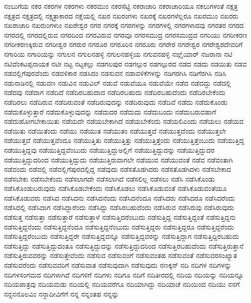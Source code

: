 {ನಂಬುಗೆಯ
ನಕರ
ನಕರಗಳ
ನಕರಗಳು
ನಕರಮುಂ
ನಕರಸೆಟ್ಟಿ
ನಕರಾಚಾರಿ
ನಕರಾಚಾರಿಯೂ
ನಕಲುಗಳಂತೆ
ನಕ್ಷತ್ರ
ನಕ್ಷತ್ರದ
ನಕ್ಷತ್ರದಲ್ಲಿ
ನಕ್ಷತ್ರಾಕಾರದ
ನಕ್ಷೆಯಲ್ಲಿ
ನಖರ
ನಖರಂಗಳು
ನಖರಕ್ಕೆ
ನಖರಗಳೆಲ್ಲರೂ
ನಖರಮುಂ
ನಖರರು
ನಖರಾಚಾರಿ
ನಖರುಂಗಳುಂ
ನಖರೇಶ್ವರ
ನಗರ
ನಗರಕ್ಕೆ
ನಗರಗಳನ್ನು
ನಗರಗಳಲ್ಲಿ
ನಗರಗಳಾದವು
ನಗರತರ
ನಗರದ
ನಗರದಲ್ಲಿ
ನಗರದಲ್ಲಿರುವ
ನಗರದಿಂದ
ನಗರವಿರುವ
ನಗರವೂ
ನಗರಸಮುದ್ರ
ನಗರಸಮುದ್ರದ
ನಗರಿಯು
ನಗರೀಕರಣ
ನಗರೀಕರಣಕ್ಕಿರುವ
ನಗರೀಶ್ವರ
ನಗರುರ
ನಗರೂರ
ನಗರೂರಿನ
ನಗರೂರು
ನಗರೇರ
ನಗರೇಶ್ವರ
ನಗರೇಶ್ವರದೇವರಿಗೆ
ನಗಾರಿಯ
ನಗಾರಿಯನ್ನು
ನಗುಲನ
ನಗುಲನಹಳ್ಳಿ
ನಗುಲನಹಳ್ಳಿಯ
ನಗುವನಹಳ್ಳಿ
ನಙ್ಗೈಯಾರ್
ನಜರಾನಾ
ನಟಿ
ನಟಿವೆಂಕಟಪ್ಪನಾಯಕ
ನಟೀ
ನಟ್ಟ
ನಟ್ಟಕಲ್ಲು
ನಡಗಲಪುರ
ನಡಗಲ್ಪುರ
ನಡಗಲ್ಪುರದ
ನಡದ
ನಡದು
ನಡಯಿತು
ನಡವ
ನಡವಲ್ಲಿಗೆಪುರವೆಂದು
ನಡವಳಿಕಾರ
ನಡಸಿದಂ
ನಡಸುವನ
ನಡಾವಳಿಕೆಗಳನ್ನು
ನಡಿಗರಗಿಸಿ
ನಡಿಗೆರಗಿಸಿ
ನಡಿಸಿ
ನಡುನಾಡಿನಲ್ಲಿ
ನಡುವಣ
ನಡುವಿನ
ನಡುವಿಲ್
ನಡುವೆ
ನಡುವೆಯೂ
ನಡುವೆಯೇ
ನಡೆದ
ನಡೆದದ್ದು
ನಡೆದಲ್ಲಿ
ನಡೆದವು
ನಡೆದಾಗ
ನಡೆದಿದೆ
ನಡೆದಿರಬಹುದಾದ
ನಡೆದಿರಬಹುದು
ನಡೆದಿರಬಹುದೆಂದು
ನಡೆದಿರಬೇಕೆಂದು
ನಡೆದಿರಲು
ನಡೆದಿರುವ
ನಡೆದಿರುವಂತೆ
ನಡೆದಿರುವುದನ್ನು
ನಡೆದಿರುವುದು
ನಡೆದಿವೆ
ನಡೆದು
ನಡೆದುಕೊಂಡು
ನಡೆದುಕೊಳ್ಳುತ್ತಾರೆ
ನಡೆದುಕೊಳ್ಳುವುದನ್ನು
ನಡೆದುದರ
ನಡೆದುದು
ನಡೆದುಬಂದು
ನಡೆದುಬರುವಹಾಗೆ
ನಡೆದುಹೋಗಬೇಕಾಯಿತು
ನಡೆಯದೇ
ನಡೆಯಬೇಕಾಗಿದೆ
ನಡೆಯಬೇಕೆಂದು
ನಡೆಯಲಿಎಂದು
ನಡೆಯಲು
ನಡೆಯವ
ನಡೆಯಿತು
ನಡೆಯಿತೆಂದು
ನಡೆಯು
ನಡೆಯುತ
ನಡೆಯುತಂ
ನಡೆಯುತ್ತದೆ
ನಡೆಯುತ್ತದೆಂದು
ನಡೆಯುತ್ತಲೇ
ನಡೆಯುತ್ತವೆ
ನಡೆಯುತ್ತವೆಂದೂ
ನಡೆಯುತ್ತಿತು
ನಡೆಯುತ್ತಿತ್ತು
ನಡೆಯುತ್ತಿತ್ತೆಂದು
ನಡೆಯುತ್ತಿತ್ತೆಂಬುದು
ನಡೆಯುತ್ತಿದ್ದ
ನಡೆಯುತ್ತಿದ್ದವು
ನಡೆಯುತ್ತಿದ್ದವೆಂಬುದು
ನಡೆಯುತ್ತಿದ್ದುಅಲ್ಲಿಗೆ
ನಡೆಯುತ್ತಿದ್ದುದನ್ನು
ನಡೆಯುತ್ತಿದ್ದುದರ
ನಡೆಯುತ್ತಿದ್ದುದರಿಂದ
ನಡೆಯುತ್ತಿದ್ದುದು
ನಡೆಯುತ್ತಿರುವಾಗಲೇ
ನಡೆಯುವ
ನಡೆಯುವಂತೆ
ನಡೆವ
ನಡೆವಂತಾಗಿ
ನಡೆವಂದು
ನಡೆವಲ್ಲಿ
ನಡೆವಲ್ಲಿಗೆಪುರದಲ್ಲಿದ್ದ
ನಡೆವುದು
ನಡೆಸತೊಡಗಿದರು
ನಡೆಸತೊಡಗಿದಳು
ನಡೆಸಬೇಕಾದ
ನಡೆಸಬೇಕು
ನಡೆಸಬೇಕೆಂದು
ನಡೆಸಲಾಗದೇ
ನಡೆಸಲಾಗಿದೆ
ನಡೆಸಲಿಲ್ಲ
ನಡೆಸಲು
ನಡೆಸಿ
ನಡೆಸಿಕೊಂಡು
ನಡೆಸಿಕೊಂಡುಬರುವುದು
ನಡೆಸಿಕೊಡಬೇಕೆಂದು
ನಡೆಸಿಕೊಡಲು
ನಡೆಸಿಕೊಡುವಂತೆ
ನಡೆಸಿಕೊಡುವಂತೆಯೂ
ನಡೆಸಿಕೊಡುವರು
ನಡೆಸಿದ
ನಡೆಸಿದನು
ನಡೆಸಿದನೆಂದು
ನಡೆಸಿದನೆಂದೂ
ನಡೆಸಿದರು
ನಡೆಸಿದರೂ
ನಡೆಸಿದರೆಂದು
ನಡೆಸಿದಲ್ಲಿ
ನಡೆಸಿದಾಗ
ನಡೆಸಿದ್ದಾರೆಂದು
ನಡೆಸಿದ್ದು
ನಡೆಸಿರಬಹುದೆಂದು
ನಡೆಸಿರುವ
ನಡೆಸಿರುವು
ನಡೆಸಿರುವುದು
ನಡೆಸುತ್ತ
ನಡೆಸುತ್ತಾ
ನಡೆಸುತ್ತಾರೆ
ನಡೆಸುತ್ತಾಳೆ
ನಡೆಸುತ್ತಿದರೆಂಬುದು
ನಡೆಸುತ್ತಿದ್ದ
ನಡೆಸುತ್ತಿದ್ದಂತೆ
ನಡೆಸುತ್ತಿದ್ದನು
ನಡೆಸುತ್ತಿದ್ದನೆಂದು
ನಡೆಸುತ್ತಿದ್ದನೆಂದೂ
ನಡೆಸುತ್ತಿದ್ದನೆಂಬುದು
ನಡೆಸುತ್ತಿದ್ದರು
ನಡೆಸುತ್ತಿದ್ದರೂ
ನಡೆಸುತ್ತಿದ್ದರೆಂದು
ನಡೆಸುತ್ತಿದ್ದರೆಂಬುದು
ನಡೆಸುತ್ತಿದ್ದರೇ
ನಡೆಸುತ್ತಿದ್ದವನ್ನೂ
ನಡೆಸುತ್ತಿದ್ದವರನ್ನು
ನಡೆಸುತ್ತಿದ್ದಾಗ
ನಡೆಸುತ್ತಿದ್ದಿರಬಹುದು
ನಡೆಸುತ್ತಿದ್ದು
ನಡೆಸುತ್ತಿದ್ದುದಂತೂ
ನಡೆಸುತ್ತಿದ್ದುದನ್ನು
ನಡೆಸುತ್ತಿದ್ದುದರಿಂದ
ನಡೆಸುತ್ತಿರಬಹುದೆಂದು
ನಡೆಸುತ್ತಿರುತ್ತಾನೆ
ನಡೆಸುತ್ತಿರುವವರನ್ನು
ನಡೆಸುತ್ತೇವೆಂದು
ನಡೆಸುವ
ನಡೆಸುವಂಗೆ
ನಡೆಸುವಂತಹ
ನಡೆಸುವಂತೆ
ನಡೆಸುವರಸಂಖ್ಯಾತ
ನಡೆಸುವರೆಂದು
ನಡೆಸುವವರಿಗೆ
ನಡೆಸುವಾತ
ನಡೆಸುವುದಾಗಿ
ನಡೆಸುವುದು
ನಣಕ್ಕನ್
ನದಿ
ನದಿಗಳ
ನದಿಗಳನ್ನು
ನದಿಗಳಸಂಗಮದ
ನದಿಗಳಾಗಿವೆ
ನದಿಗಳಿಗೆ
ನದಿಗಳು
ನದಿಗೂ
ನದಿಗೆ
ನದಿತೀರದಲ್ಲಿ
ನದಿಯ
ನದಿಯನ್ನು
ನದಿಯನ್ನೂ
ನದಿಯಪಾತ್ರವು
ನದಿಯಮಡು
ನದಿಯಲ್ಲಿ
ನದಿಯವರೆಗೂ
ನದಿಯಾಗಿದ್ದು
ನದಿಯಾಚೆ
ನದಿಯಿಂದ
ನದಿಯು
ನನಗೆ
ನನ್ದನನೊಲವಿಂ
ನನ್ದಾದೀವಿಗೆಗೆ
ನನ್ನ
ನನ್ನಂತಹ
ನನ್ನನ್ನು
}
